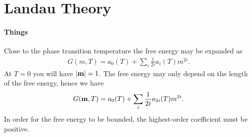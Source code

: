 \section{Landau Theory}

\paragraph{Things}
Close to the phase transition temperature the free energy may be expanded as
\begin{align*}
	G(m, T) = a_{0}(T) + \sum\limits_{i}\frac{1}{2i}a_{i}(T)m^{2i}.
\end{align*}
At $T = 0$ you will have $\abs{\vb{m}} = 1$. The free energy may only depend on the length of the free energy, hence we have
\begin{align*}
	G(\vb{m}, T) = a_{0}(T) + \sum\limits_{i}\frac{1}{2i}a_{2i}(T)m^{2i}.
\end{align*}
In order for the free energy to be bounded, the highest-order coefficient must be positive.

